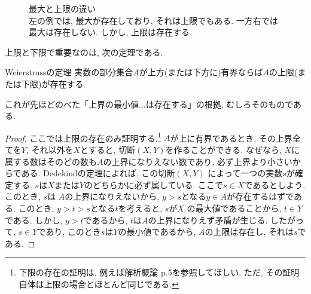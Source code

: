         \begin{figure}[h]
            \centering
            \caption{最大と上限の違い\\{\scriptsize 左の例では, 最大が存在しており, それは上限でもある. 一方右では最大は存在しない. しかし, 上限は存在する.}}
        \end{figure}
        \clearpage
        上限と下限で重要なのは, 次の定理である. 
        \begin{itembox}{Weierstrassの定理}
            実数の部分集合$A$が上方(または下方に)有界ならば$A$の上限(または下限)が存在する.
        \end{itembox}
        これが先ほどのべた「上界の最小値...は存在する」の根拠, むしろそのものである. 
        \begin{proof}
            ここでは上限の存在のみ証明する.\footnote{下限の存在の証明は, 例えば解析概論 p.5を参照してほしい. ただ, その証明自体は上限の場合とほとんど同じである.}
            $A$が上に有界であるとき, その上界全てを$Y$, それ以外を$X$とすると, 切断$(X,Y)$を作ることができる.
            なぜなら, $X$に属する数はそのどの数も$A$の上界になりえない数であり, 必ず上界より小さいからである. Dedekindの定理によれば, この切断$(X,Y)$
            によって一つの実数$s$が確定する. $s$は$X$または$Y$のどちらかに必ず属している. ここで$s\in X$であるとしよう. このとき, $s$は
            $A$の上界になりえないから, $y>s$となる$y\in A$が存在するはずである. このとき, $y>t>s$となる$t$を考えると, $s$が$X$
            の最大値であることから, $t\in Y$である. しかし, $y>t$であるから, $t$は$A$の上界になりえず矛盾が生じる.
            したがって, $s\in Y$であり, このとき$s$は$Y$の最小値であるから, $A$の上限は存在し, それは$s$である.
        \end{proof}

